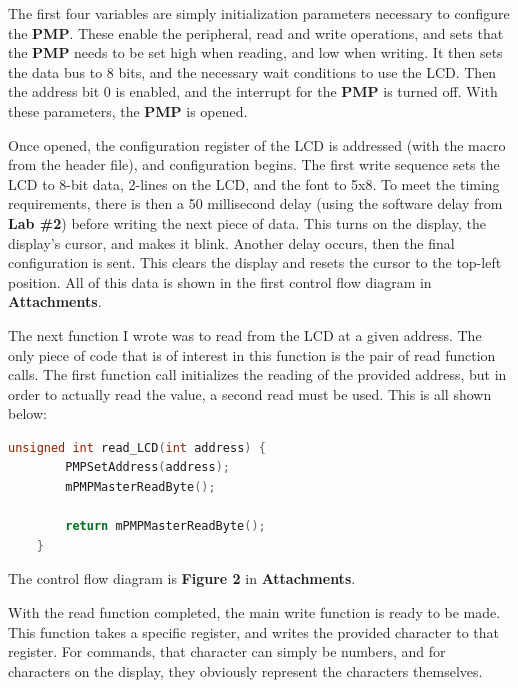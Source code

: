 \documentclass[a4paper, 12pt]{article}
\begin{document}
The first four variables are simply initialization parameters necessary to configure the \textbf{PMP}. These enable the peripheral, read and write operations, and sets that the \textbf{PMP} needs to be set high when reading, and low when writing. It then sets the data bus to 8 bits, and the necessary wait conditions to use the LCD. Then the address bit 0 is enabled, and the interrupt for the \textbf{PMP} is turned off. With these parameters, the \textbf{PMP} is opened.

Once opened, the configuration register of the LCD is addressed (with the macro from the header file), and configuration begins. The first write sequence sets the LCD to 8-bit data, 2-lines on the LCD, and the font to 5x8. To meet the timing requirements, there is then a 50 millisecond delay (using the software delay from \textbf{Lab \#2}) before writing the next piece of data. This turns on the display, the display's cursor, and makes it blink. Another delay occurs, then the final configuration is sent. This clears the display and resets the cursor to the top-left position. All of this data is shown in the first control flow diagram in \textbf{Attachments}.

The next function I wrote was to read from the LCD at a given address. The only piece of code that is of interest in this function is the pair of read function calls. The first function call initializes the reading of the provided address, but in order to actually read the value, a second read must be used. This is all shown below:

	\begin{mdframed}[backgroundcolor=code-gray, roundcorner=10pt,
								innerleftmargin=5, innertopmargin=5, innerbottommargin=5]	
	\begin{lstlisting}[language=C, caption=LCD Read Function, tabsize=2]
	unsigned int read_LCD(int address) {
		PMPSetAddress(address);
		mPMPMasterReadByte();

		return mPMPMasterReadByte();
	}
	\end{lstlisting}
	\end{mdframed}
	
The control flow diagram is \textbf{Figure 2} in \textbf{Attachments}.

With the read function completed, the main write function is ready to be made. This function takes a specific register, and writes the provided character to that register. For commands, that character can simply be numbers, and for characters on the display, they obviously represent the characters themselves.
\end{document}
